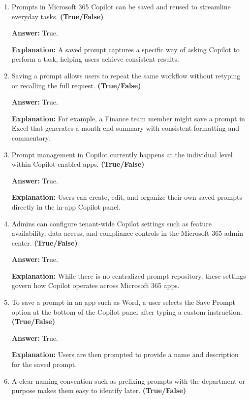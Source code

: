 \documentclass[10pt]{article}
\begin{document}
\begin{enumerate}[leftmargin=*]

\item Prompts in Microsoft 365 Copilot can be saved and reused to streamline everyday tasks. \textbf{(True/False)}

\textbf{Answer:} True.

\textbf{Explanation:} A saved prompt captures a specific way of asking Copilot to perform a task, helping users achieve consistent results.

\item Saving a prompt allows users to repeat the same workflow without retyping or recalling the full request. \textbf{(True/False)}

\textbf{Answer:} True.

\textbf{Explanation:} For example, a Finance team member might save a prompt in Excel that generates a month-end summary with consistent formatting and commentary.

\item Prompt management in Copilot currently happens at the individual level within Copilot-enabled apps. \textbf{(True/False)}

\textbf{Answer:} True.

\textbf{Explanation:} Users can create, edit, and organize their own saved prompts directly in the in-app Copilot panel.

\item Admins can configure tenant-wide Copilot settings such as feature availability, data access, and compliance controls in the Microsoft 365 admin center. \textbf{(True/False)}

\textbf{Answer:} True.

\textbf{Explanation:} While there is no centralized prompt repository, these settings govern how Copilot operates across Microsoft 365 apps.

\item To save a prompt in an app such as Word, a user selects the Save Prompt option at the bottom of the Copilot panel after typing a custom instruction. \textbf{(True/False)}

\textbf{Answer:} True.

\textbf{Explanation:} Users are then prompted to provide a name and description for the saved prompt.

\item A clear naming convention such as prefixing prompts with the department or purpose makes them easy to identify later. \textbf{(True/False)}


\end{enumerate}
\end{document}
